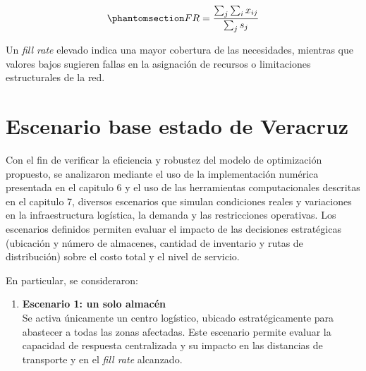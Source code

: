 \documentclass[
  spanish,
  us-letterpaper,
]{scrreprt}
\providecommand{\tightlist}{%
  \setlength{\itemsep}{0pt}\setlength{\parskip}{0pt}}
\numberwithin{equation}{section}
\begin{document}
\begin{equation}\phantomsection\label{eq-FR}{
FR = \frac{\sum_{j} \sum_i x_{ij}}{\sum_j s_j} 
}\end{equation}

Un \emph{fill rate} elevado indica una mayor cobertura de las
necesidades, mientras que valores bajos sugieren fallas en la asignación
de recursos o limitaciones estructurales de la red.

\section{Escenario base estado de Veracruz}\label{sec-Veracruz}

Con el fin de verificar la eficiencia y robustez del modelo de
optimización propuesto, se analizaron mediante el uso de la
implementación numérica presentada en el capitulo 6 y el uso de las
herramientas computacionales descritas en el capitulo 7, diversos
escenarios que simulan condiciones reales y variaciones en la
infraestructura logística, la demanda y las restricciones operativas.
Los escenarios definidos permiten evaluar el impacto de las decisiones
estratégicas (ubicación y número de almacenes, cantidad de inventario y
rutas de distribución) sobre el costo total y el nivel de servicio.

En particular, se consideraron:

\begin{enumerate}
\def\labelenumi{\arabic{enumi}.}
\tightlist
\item
  \textbf{Escenario 1: un solo almacén}\\
  Se activa únicamente un centro logístico, ubicado estratégicamente
  para abastecer a todas las zonas afectadas. Este escenario permite
  evaluar la capacidad de respuesta centralizada y su impacto en las
  distancias de transporte y en el \emph{fill rate} alcanzado.
\end{enumerate}
\end{document}
